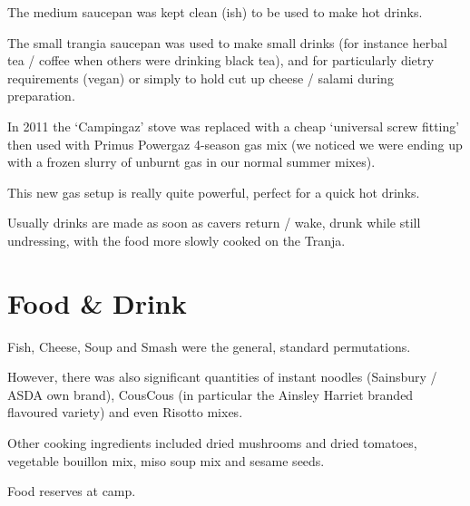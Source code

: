 The medium saucepan was kept clean (ish) to be used to make hot drinks.

The small trangia saucepan was used to make small drinks (for instance herbal tea / coffee when others were drinking black tea), and for particularly dietry requirements (vegan) or simply to hold cut up cheese / salami during preparation.

In 2011 the `Campingaz' stove was replaced with a cheap `universal screw fitting' then used with Primus Powergaz 4-season gas mix (we noticed we were ending up with a frozen slurry of unburnt gas in our normal summer mixes).

This new gas setup is really quite powerful, perfect for a quick hot drinks.

Usually drinks are made as soon as cavers return / wake, drunk while still undressing, with the food more slowly cooked on the Tranja.


\section{Food \& Drink}

Fish, Cheese, Soup and Smash were the general, standard permutations.

However, there was also significant quantities of instant noodles (Sainsbury / ASDA own brand), CousCous (in particular the Ainsley Harriet branded flavoured variety) and even Risotto mixes.

Other cooking ingredients included dried mushrooms and dried tomatoes, vegetable bouillon mix, miso soup mix and sesame seeds.

\begin{marginfigure}
\checkoddpage \ifoddpage \forcerectofloat \else \forceversofloat \fi
\centering
 \caption{Food reserves at camp. }
 \label{food reserves}
\end{marginfigure}

